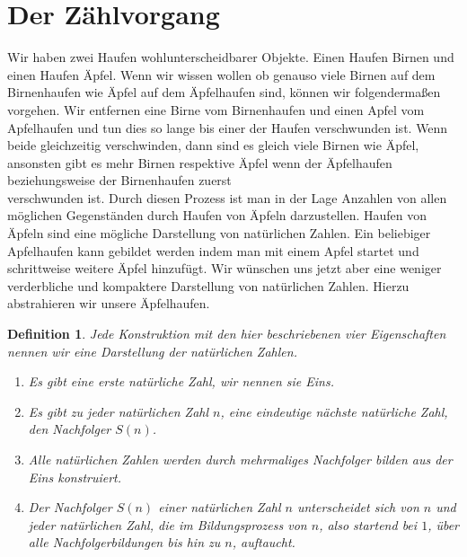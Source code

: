 \documentclass[11pt,a4paper,leqno]{report}
\newtheorem{definition}[theorem]{Definition}
\numberwithin{equation}{chapter}
\begin{document}
\section{Der Zählvorgang} Wir haben zwei Haufen wohlunterscheidbarer Objekte. Einen Haufen Birnen und einen Haufen Äpfel. Wenn wir wissen wollen ob genauso viele Birnen auf dem Birnenhaufen wie Äpfel auf dem Äpfelhaufen sind, können wir folgendermaßen vorgehen. Wir entfernen eine Birne vom Birnenhaufen und einen Apfel vom Apfelhaufen und tun dies so lange bis einer der Haufen verschwunden ist. Wenn beide gleichzeitig verschwinden, dann sind es gleich viele Birnen wie Äpfel, ansonsten gibt es mehr Birnen respektive Äpfel wenn der Äpfelhaufen beziehungsweise der Birnenhaufen zuerst \\verschwunden ist. Durch diesen Prozess ist man in der Lage Anzahlen von allen möglichen Gegenständen durch Haufen von Äpfeln darzustellen. Haufen von Äpfeln sind eine mögliche Darstellung von natürlichen Zahlen. Ein beliebiger Apfelhaufen kann gebildet werden indem man mit einem Apfel startet und schrittweise weitere Äpfel hinzufügt. Wir wünschen uns jetzt aber eine weniger verderbliche und kompaktere Darstellung von natürlichen Zahlen. Hierzu abstrahieren wir unsere Äpfelhaufen. 
\begin{definition} Jede Konstruktion mit den hier beschriebenen vier Eigenschaften nennen wir eine Darstellung der natürlichen Zahlen.
	\begin{enumerate}
		\item Es gibt eine erste natürliche Zahl, wir nennen sie Eins.
		\item Es gibt zu jeder natürlichen Zahl $n$, eine eindeutige nächste natürliche Zahl, den Nachfolger $S(n)$.
		\item Alle natürlichen Zahlen werden durch mehrmaliges Nachfolger bilden aus der Eins konstruiert.
		\item Der Nachfolger $S(n)$ einer natürlichen Zahl $n$ unterscheidet sich von $n$ und jeder natürlichen Zahl, die im Bildungsprozess von $n$, also startend bei $1$, über alle Nachfolgerbildungen bis hin zu $n$, auftaucht.
	\end{enumerate}
\end{definition}
\end{document}
